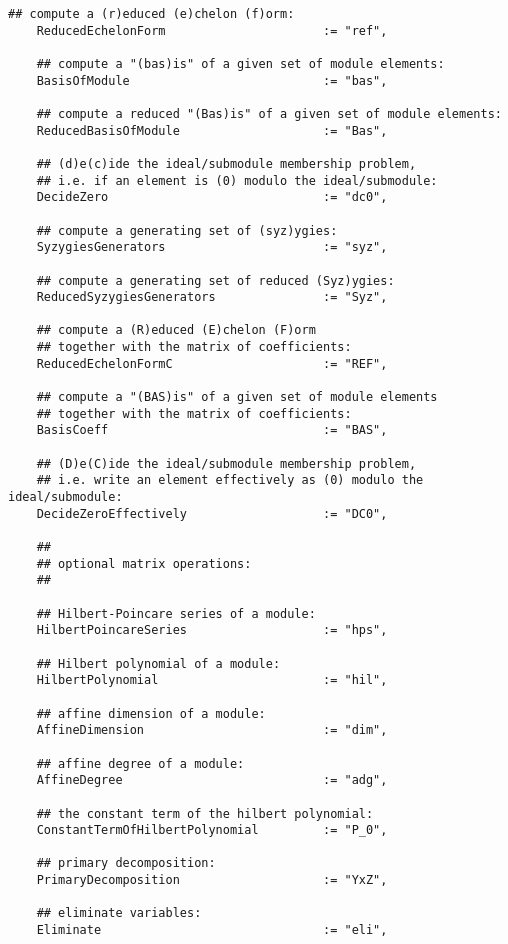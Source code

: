 \documentclass[a4paper,11pt]{report}
\begin{document}
{{{\begin{Verbatim}[fontsize=\small,frame=single,label=Code]
    ## compute a (r)educed (e)chelon (f)orm:
    ReducedEchelonForm                      := "ref",
    
    ## compute a "(bas)is" of a given set of module elements:
    BasisOfModule                           := "bas",
    
    ## compute a reduced "(Bas)is" of a given set of module elements:
    ReducedBasisOfModule                    := "Bas",
    
    ## (d)e(c)ide the ideal/submodule membership problem,
    ## i.e. if an element is (0) modulo the ideal/submodule:
    DecideZero                              := "dc0",
    
    ## compute a generating set of (syz)ygies:
    SyzygiesGenerators                      := "syz",
    
    ## compute a generating set of reduced (Syz)ygies:
    ReducedSyzygiesGenerators               := "Syz",
    
    ## compute a (R)educed (E)chelon (F)orm
    ## together with the matrix of coefficients:
    ReducedEchelonFormC                     := "REF",
    
    ## compute a "(BAS)is" of a given set of module elements
    ## together with the matrix of coefficients:
    BasisCoeff                              := "BAS",
    
    ## (D)e(C)ide the ideal/submodule membership problem,
    ## i.e. write an element effectively as (0) modulo the ideal/submodule:
    DecideZeroEffectively                   := "DC0",
    
    ##
    ## optional matrix operations:
    ##
    
    ## Hilbert-Poincare series of a module:
    HilbertPoincareSeries                   := "hps",
    
    ## Hilbert polynomial of a module:
    HilbertPolynomial                       := "hil",
    
    ## affine dimension of a module:
    AffineDimension                         := "dim",
    
    ## affine degree of a module:
    AffineDegree                            := "adg",
    
    ## the constant term of the hilbert polynomial:
    ConstantTermOfHilbertPolynomial         := "P_0",
    
    ## primary decomposition:
    PrimaryDecomposition                    := "YxZ",
    
    ## eliminate variables:
    Eliminate                               := "eli",
    

\end{Verbatim}}}}
\end{document}
